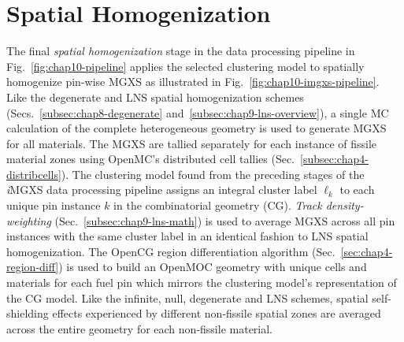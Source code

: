 \section{Spatial Homogenization}
\label{sec:chap10-imgxs-homogenization}

The final \textit{spatial homogenization} stage in the data processing pipeline in Fig.~\ref{fig:chap10-pipeline} applies the selected clustering model to spatially homogenize pin-wise \ac{MGXS} as illustrated in Fig.~\ref{fig:chap10-imgxs-pipeline}. Like the degenerate and \ac{LNS} spatial homogenization schemes (Secs.~\ref{subsec:chap8-degenerate} and~\ref{subsec:chap9-lns-overview}), a single \ac{MC} calculation of the complete heterogeneous geometry is used to generate \ac{MGXS} for all materials. The \ac{MGXS} are tallied separately for each instance of fissile material zones using OpenMC's distributed cell tallies (Sec.~\ref{subsec:chap4-distribcells}). The clustering model found from the preceding stages of the \textit{i}\ac{MGXS} data processing pipeline assigns an integral cluster label $\ell_{k}$ to each unique pin instance $k$ in the combinatorial geometry (CG). \textit{Track density-weighting} (Sec.~\ref{subsec:chap9-lns-math}) is used to average \ac{MGXS} across all pin instances with the same cluster label in an identical fashion to \ac{LNS} spatial homogenization. The OpenCG region differentiation algorithm (Sec.~\ref{sec:chap4-region-diff}) is used to build an OpenMOC geometry with unique cells and materials for each fuel pin which mirrors the clustering model's representation of the \ac{CG} model. Like the infinite, null, degenerate and \ac{LNS} schemes, spatial self-shielding effects experienced by different non-fissile spatial zones are averaged across the entire geometry for each non-fissile material.

